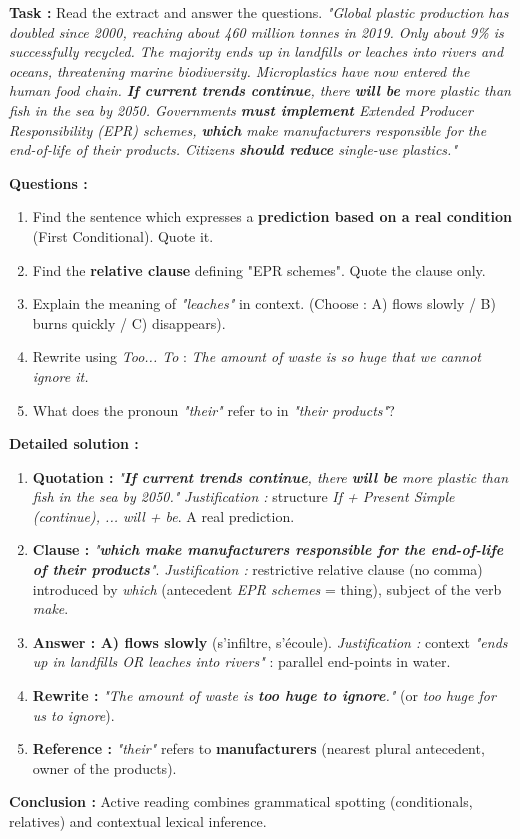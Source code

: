 \documentclass[11pt]{article}
\newcommand{\cle}[1]{{\popxbold\color{popdark}#1}}
\begin{document}
\begin{exoresolu}
\textbf{Task :} Read the extract and answer the questions.
\textit{"Global plastic production has doubled since 2000, reaching about 460 million tonnes in 2019. Only about 9\% is successfully recycled. The majority ends up in \cle{landfills} or \cle{leaches} into rivers and oceans, threatening marine \cle{biodiversity}. Microplastics have now entered the human food chain. \textbf{If current trends continue}, there \textbf{will be} more plastic than fish in the sea by 2050. Governments \textbf{must implement} Extended Producer Responsibility (EPR) schemes, \textbf{which} make manufacturers responsible for the end-of-life of their products. Citizens \textbf{should reduce} single-use plastics."}

\textbf{Questions :}
\begin{enumerate}
    \item Find the sentence which expresses a \textbf{prediction based on a real condition} (First Conditional). Quote it.
    \item Find the \textbf{relative clause} defining "EPR schemes". Quote the clause only.
    \item Explain the meaning of \textit{"leaches"} in context. (Choose : A) flows slowly / B) burns quickly / C) disappears).
    \item Rewrite using \textit{Too... To} : \textit{The amount of waste is so huge that we cannot ignore it.}
    \item What does the pronoun \textit{"their"} refer to in \textit{"their products"}?
\end{enumerate}

\tcblower
\textbf{Detailed solution :}
\begin{enumerate}
    \item \textbf{Quotation :} \textit{"\textbf{If current trends continue}, there \textbf{will be} more plastic than fish in the sea by 2050."}
    \textit{Justification :} structure \textit{If + Present Simple (continue), ... will + be}. A real prediction.
    \item \textbf{Clause :} \textit{"\textbf{which make manufacturers responsible for the end-of-life of their products}"}.
    \textit{Justification :} restrictive relative clause (no comma) introduced by \textit{which} (antecedent \textit{EPR schemes} = thing), subject of the verb \textit{make}.
    \item \textbf{Answer : A) flows slowly} (s'infiltre, s'écoule).
    \textit{Justification :} context \textit{"ends up in landfills OR leaches into rivers"} : parallel end-points in water.
    \item \textbf{Rewrite :} \textit{"The amount of waste is \textbf{too huge to ignore}."} (or \textit{too huge for us to ignore}).
    \item \textbf{Reference :} \textit{"their"} refers to \textbf{manufacturers} (nearest plural antecedent, owner of the products).
\end{enumerate}
\textbf{Conclusion :} Active reading combines grammatical spotting (conditionals, relatives) and contextual lexical inference.
\end{exoresolu}
\end{document}
